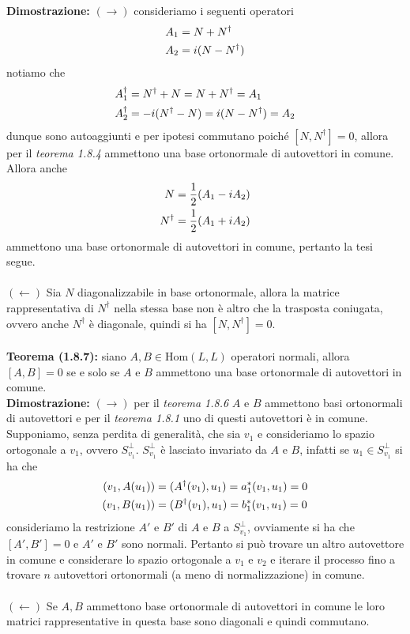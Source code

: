 \documentclass{article}
\begin{document}
\textbf{Dimostrazione:} $(\rightarrow)$ consideriamo i seguenti operatori
\begin{align}
    A_1 &= N + N^\dagger \notag \\
    A_2&= i(N - N^\dagger) \notag
\end{align}
notiamo che
\begin{align}
    A^\dagger_1 &= N^\dagger + N = N + N^\dagger = A_1 \notag \\
    A^\dagger_2 &= -i(N^\dagger - N) = i(N - N^\dagger) = A_2 \notag
\end{align}
dunque sono autoaggiunti e per ipotesi commutano poiché $[N, N^\dagger] = 0$, allora per il \textit{teorema 1.8.4} ammettono una base ortonormale di autovettori in comune. Allora anche
\begin{align}
    N &= \frac{1}{2}(A_1 - iA_2) \notag \\
    N^\dagger &= \frac{1}{2}(A_1 + iA_2) \notag
\end{align}
ammettono una base ortonormale di autovettori in comune, pertanto la tesi segue. \\ \\
$(\leftarrow)$ Sia $N$ diagonalizzabile in base ortonormale, allora la matrice rappresentativa di $N^\dagger$ nella stessa base non è altro che la trasposta coniugata, ovvero anche $N^\dagger$ è diagonale, quindi si ha $[N, N^\dagger] = 0$. \\ \\
\textbf{Teorema (1.8.7):} siano $A, B \in \mathrm{Hom}(L, L)$ operatori normali, allora $[A, B] = 0$ se e solo se $A$ e $B$ ammettono una base ortonormale di autovettori in comune. \\

\textbf{Dimostrazione:} $(\rightarrow)$ per il \textit{teorema 1.8.6} $A$ e $B$ ammettono basi ortonormali di autovettori e per il \textit{teorema 1.8.1} uno di questi autovettori è in comune. Supponiamo, senza perdita di generalità, che sia $v_1$ e consideriamo lo spazio ortogonale a $v_1$, ovvero $S^\perp_{v_1}$. $S^\perp_{v_1}$ è lasciato invariato da $A$ e $B$, infatti se $u_1 \in S^\perp_{v_1}$ si ha che
\begin{align}
    (v_1, A(u_1)) &= (A^\dagger(v_1), u_1) = a^*_1(v_1, u_1) = 0 \notag \\
    (v_1, B(u_1)) &= (B^\dagger(v_1), u_1) = b^*_1(v_1, u_1) = 0 \notag
\end{align}
consideriamo la restrizione $A'$ e $B'$ di $A$ e $B$ a $S^\perp_{v_1}$, ovviamente si ha che $[A', B'] = 0$ e $A'$ e $B'$ sono normali. Pertanto si può trovare un altro autovettore in comune e considerare lo spazio ortogonale a $v_1$ e $v_2$ e iterare il processo fino a trovare $n$ autovettori ortonormali (a meno di normalizzazione) in comune. \\ \\
$(\leftarrow)$ Se $A, B$ ammettono base ortonormale di autovettori in comune le loro matrici rappresentative in questa base sono diagonali e quindi commutano. \\ \\
\end{document}
